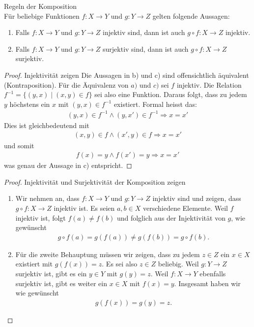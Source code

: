 \begin{lemma}{Regeln der Komposition}\\
    Für beliebige Funktionen $f:X\to Y$ und $g:Y\to Z$ gelten folgende Aussagen:
    \begin{enumerate}
        \item Falls $f:X\to Y$ und $g:Y\to Z$ injektiv sind, dann ist auch $g\circ f:X\to Z$ injektiv.
        \item Falls $f:X\to Y$ und $g:Y\to Z$ surjektiv sind, dann ist auch $g\circ f:X\to Z$ surjektiv.
    \end{enumerate}
\end{lemma}

\begin{proof}{Injektivität zeigen}
    Die Aussagen in b) und c) sind offensichtlich äquivalent (Kontraposition). Für die Äquivalenz von $a)$ und $c)$ sei $f$ injektiv. Die Relation $f^{-1}=\{(y,x)\mid (x,y)\in f\}$ sei also eine Funktion. Daraus folgt, dass zu jedem $y$ höchstens ein $x$ mit $(y,x)\in f^{-1}$ existiert. Formal heisst das:
    \begin{align*}
        (y,x)\in f^{-1}\land (y,x')\in f^{-1}\Rightarrow x=x'
    \end{align*}
    Dies ist gleichbedeutend mit
    \begin{align*}
        (x,y)\in f\land (x',y)\in f\Rightarrow x=x'
    \end{align*}
    und somit
    \begin{align*}
        f(x)=y\land f(x')=y\Rightarrow x=x'
    \end{align*}
    was genau der Aussage in c) entspricht.
\end{proof}

\begin{proof}{Injektivität und Surjektivität der Komposition zeigen}
    \begin{enumerate}
        \item Wir nehmen an, dass $f:X\to Y$ und $g:Y\to Z$ injektiv sind und zeigen, dass $g\circ f:X\to Z$ injektiv ist. Es seien $a,b\in X$ verschiedene Elemente. Weil $f$ injektiv ist, folgt $f(a)\neq f(b)$ und folglich aus der Injektivität von $g$, wie gewünscht
        \begin{align*}
            g\circ f(a) = g(f(a))\neq g(f(b))=g\circ f(b).
        \end{align*}
        \item Für die zweite Behauptung müssen wir zeigen, dass zu jedem $z\in Z$ ein $x\in X$ existiert mit $g(f(x))= z$. Es sei also $z\in Z$ beliebig. Weil $g:Y\to Z$ surjektiv ist, gibt es ein $y\in Y$ mit $g(y)=z$. Weil $f:X\to Y$ ebenfalls surjektiv ist, gibt es weiter ein $x\in X$ mit $f(x) = y$. Insgesamt haben wir wie gewünscht
        \begin{align*}
            g(f(x))=g(y)=z.
        \end{align*}
    \end{enumerate}
\end{proof}

